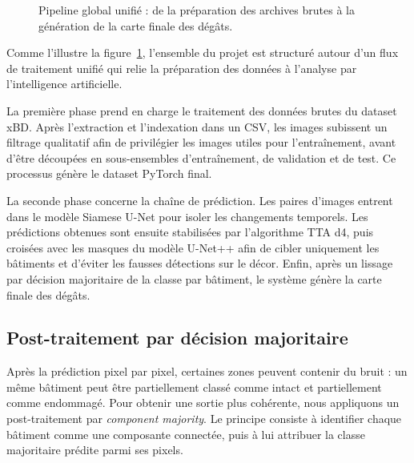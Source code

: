\documentclass[french,12pt]{article}
\begin{document}
\begin{figure}[H]
\begin{tikzpicture}
    \end{tikzpicture}
    \caption{Pipeline global unifié : de la préparation des archives brutes à la génération de la carte finale des dégâts.}
    \label{fig:pipeline_global}
\end{figure}

Comme l'illustre la figure~\ref{fig:pipeline_global}, l'ensemble du projet est structuré autour d'un flux de traitement unifié qui relie la préparation des données à l'analyse par l'intelligence artificielle.

La première phase prend en charge le traitement des données brutes du dataset xBD. Après l'extraction et l'indexation dans un CSV, les images subissent un filtrage qualitatif afin de privilégier les images utiles pour l'entraînement, avant d'être découpées en sous-ensembles d'entraînement, de validation et de test. Ce processus génère le dataset PyTorch final.

La seconde phase concerne la chaîne de prédiction. Les paires d'images entrent dans le modèle Siamese U-Net pour isoler les changements temporels. Les prédictions obtenues sont ensuite stabilisées par l'algorithme TTA d4, puis croisées avec les masques du modèle U-Net++ afin de cibler uniquement les bâtiments et d'éviter les fausses détections sur le décor. Enfin, après un lissage par décision majoritaire de la classe par bâtiment, le système génère la carte finale des dégâts.

\subsection{Post-traitement par décision majoritaire}

Après la prédiction pixel par pixel, certaines zones peuvent contenir du bruit : un même bâtiment peut être partiellement classé comme intact et partiellement comme endommagé. Pour obtenir une sortie plus cohérente, nous appliquons un post-traitement par \textit{component majority}. Le principe consiste à identifier chaque bâtiment comme une composante connectée, puis à lui attribuer la classe majoritaire prédite parmi ses pixels.
\end{document}
